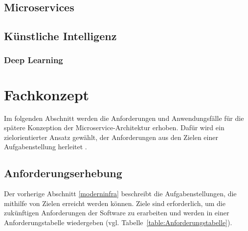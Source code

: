 \subsection{Microservices}
\subsection{Künstliche Intelligenz}
\subsubsection{Deep Learning}



\section{Fachkonzept}
Im folgenden Abschnitt werden die Anforderungen und Anwendungsfälle für die spätere Konzeption der Microservice-Architektur erhoben.
Dafür wird ein zielorientierter Ansatz gewählt, der Anforderungen aus den Zielen einer Aufgabenstellung herleitet \cite[S.47]{Laplante}. 

\subsection{Anforderungserhebung}
Der vorherige Abschnitt \ref{moderninfra} beschreibt die Aufgabenstellungen, die mithilfe von Zielen erreicht werden können. 
Ziele sind erforderlich, um die zukünftigen Anforderungen der Software zu erarbeiten und werden in einer Anforderungstabelle wiedergeben (vgl. Tabelle~\ref{table:Anforderungstabelle}). 


